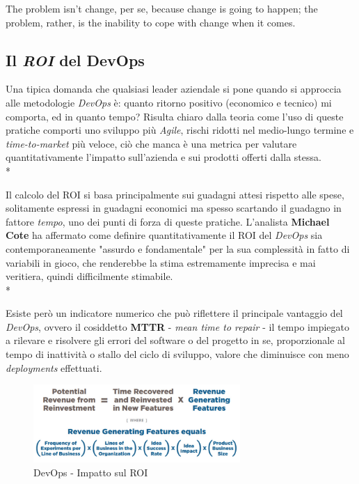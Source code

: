 \documentclass[a4paper,12pt]{report}
\begin{document}
	        \begin{fquote}
    		 	The problem isn't change, per se, because change is going to happen; the problem, rather, is the inability to cope with change when it comes.
    	 	\end{fquote}
	
		    \subsection{Il \emph{ROI} del DevOps}
		
		        Una tipica domanda che qualsiasi leader aziendale si pone quando si approccia alle metodologie \emph{DevOps} è: quanto ritorno positivo (economico e tecnico) mi comporta, ed in quanto tempo?
		        Risulta chiaro dalla teoria come l'uso di queste pratiche comporti uno sviluppo più \emph{Agile}, rischi ridotti nel medio-lungo termine e \emph{time-to-market} più veloce, ciò che manca è una metrica per valutare quantitativamente l'impatto sull'azienda e sui prodotti offerti dalla stessa.\\*
		        
		        Il calcolo del ROI si basa principalmente sui guadagni attesi rispetto alle spese, solitamente espressi in guadagni economici ma spesso scartando il guadagno in fattore \emph{tempo}, uno dei punti di forza di queste pratiche. L'analista \textbf{Michael Cote} ha affermato come definire quantitativamente il ROI del \emph{DevOps} sia contemporaneamente "assurdo e fondamentale" per la sua complessità in fatto di variabili in gioco, che renderebbe la stima estremamente imprecisa e mai veritiera, quindi difficilmente stimabile.\\*
		        
			    Esiste però un indicatore numerico che può riflettere il principale vantaggio del \emph{DevOps}, ovvero il cosiddetto \textbf{MTTR} - \emph{mean time to repair} - il tempo impiegato a rilevare e risolvere gli errori del software o del progetto in se, proporzionale al tempo di inattività o stallo del ciclo di sviluppo, valore che diminuisce con meno \emph{deployments} effettuati.
			    
			    \begin{figure}[ht]
    				\centering
    				\includegraphics[width=0.7\textwidth]{devops_roi}
    				\caption{DevOps - Impatto sul ROI}
    				\label{fig:devops_roi}
			    \end{figure}
			    
\end{document}
